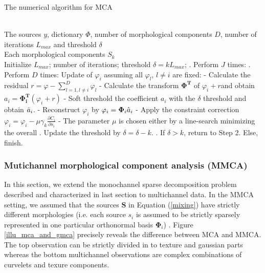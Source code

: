 \begin{algorithm}
\caption{The numerical algorithm for MCA} 
\label{algFramwork1} 
\begin{algorithmic} %
\REQUIRE ~~\\%
The sources $y$, dictionary $\Phi$, number of morphological components $D$, number of iterations $L_{max}$ and threshold $\delta$
\ENSURE ~~\\ %
Each morphological components $S_k$\\
\STATE Initialize $L_{max}$; number of iterations; threshold $ \delta= k L_{max}$;
. Perform $J$ times:
\STATE {}. Perform $D$ times:
\STATE \qquad \quad Update of $\varphi_i$ assuming all $\varphi_l$, $l \neq i$ are fixed:
\STATE \qquad \quad - Calculate the residual $r = \varphi − \sum_{l=1, l \neq i}^D \varphi_l$
\STATE \qquad \quad - Calculate the transform $\mathbf{\Phi^T}$ of $\varphi_i + r$and obtain $a_i = \mathbf{\Phi_i^T} (\varphi_i + r)$
\STATE \qquad \quad - Soft threshold the coefficient $a_i$ with the $\delta$ threshold and obtain $\Hat{a}_i$.
\STATE \qquad \quad - Reconstruct $\varphi_i$ by $\varphi_i = \mathbf{\Phi}_i \Hat{a}_i$
\STATE \qquad \quad - Apply the constraint correction $\varphi_i = \varphi_i - \mu \gamma_k \frac{\partial C_i}{\partial s_i}$
\STATE \qquad \quad - The parameter $\mu$ is chosen either by a line-search minimizing the overall 
. Update the threshold by $\delta = \delta - k$.
. If $\delta  > k$, return to Step 2. Else, finish.
\end{algorithmic}
\end{algorithm}

\subsubsection{Mutichannel morphological component analysis (MMCA)}
In this section, we extend the monochannel sparse decomposition problem described and characterized in last section to multichannel data. In the MMCA setting, we assumed that the sources $\mathbf{S}$ in Equation (\ref{mixing}) have strictly different morphologies (i.e. each source $s_i$ is assumed to be strictly sparsely represented in one particular orthonormal basis $\mathbf{\Phi}_i$) \cite{BobinJ_2007SaMD}. Figure \ref{illu_mca_and_gmca} precisely reveals the difference between MCA and MMCA. The top observation can be strictly divided in to texture and gaussian parts whereas the bottom multichannel observations are complex combinations of curvelets and texure components.\\

